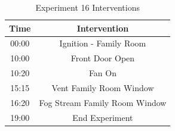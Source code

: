 \documentclass{article}
\begin{document}
\begin{table}[H]
	\centering
	\caption{Experiment 16 Interventions}
	\begin{tabular}{|c|c|} 
		\hline
		Time & Intervention \\ \hline \hline
		00:00 & Ignition - Family Room \\ \hline
		10:00 & Front Door Open \\ \hline
		10:20 & Fan On \\ \hline
		15:15 & Vent Family Room Window \\ \hline
		16:20 & Fog Stream Family Room Window \\ \hline
		19:00 & End Experiment \\ \hline
	\end{tabular}
	\label{Table:Exp16Interventions}
\end{table}

\clearpage
\end{document}
